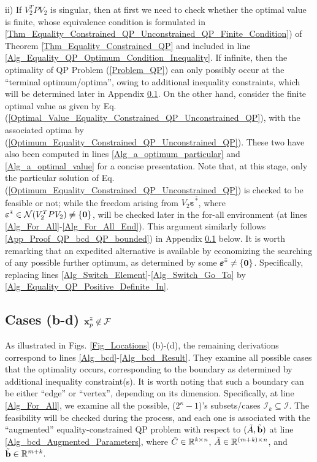 \documentclass{imaman}
\newcommand{\bfb}{{\bf b}}
\newcommand{\bfx}{{\bf x}}
\newcommand{\bfvarepsilon}{{\boldsymbol \varepsilon}}
\newcommand{\bfzero}{{\bf 0}}
\newcommand{\real}{\mathbb{R}}
\newcommand{\calF}{{\mathcal F}}
\newcommand{\calI}{{\mathcal I}}
\newcommand{\calN}{{\mathcal N}}
\newcommand{\itk}{{\it k}}
\newcommand{\itm}{{\it m}}
\newcommand{\itn}{{\it n}}
\numberwithin{equation}{section}
\begin{document}
\vspace{-0.1cm}\noindent ii) If $V_2^TPV_2$ is singular, then at first we need to check whether the optimal value is finite, whose equivalence condition is formulated in \ref{Thm_Equality_Constrained_QP_Unconstrained_QP_Finite_Condition}) of Theorem \ref{Thm_Equality_Constrained_QP} and included in line \ref{Alg_Equality_QP_Optimum_Condition_Inequality}. If infinite, then the optimality of QP Problem (\ref{Problem_QP}) can only possibly occur at the ``terminal optimum/optima'', owing to additional inequality constraints, which will be determined later in Appendix \ref{App_Proof_QP_bcd}. On the other hand, consider the finite optimal value as given by Eq. (\ref{Optimal_Value_Equality_Constrained_QP_Unconstrained_QP}), with the associated optima by (\ref{Optimum_Equality_Constrained_QP_Unconstrained_QP}). These two have also been computed in lines \ref{Alg_a_optimum_particular} and \ref{Alg_a_optimal_value} for a concise presentation. Note that, at this stage, only the particular solution of Eq. (\ref{Optimum_Equality_Constrained_QP_Unconstrained_QP}) is checked to be feasible or not; while the freedom arising from $V_2\bfvarepsilon^{\bar *}$, where $\bfvarepsilon^{\bar *}\in\calN(V_2^TPV_2)\ne\{\bfzero\}$, will be checked later in the for-all environment (at lines \ref{Alg_For_All}-\ref{Alg_For_All_End}). This argument similarly follows \ref{App_Proof_QP_bcd_QP_bounded}) in Appendix \ref{App_Proof_QP_bcd} below. It is worth remarking that an expedited alternative is available by economizing the searching of any possible further optimum, as determined by some $\bfvarepsilon^{\bar *}\ne\{\bfzero\}$. Specifically, replacing lines \ref{Alg_Switch_Element}-\ref{Alg_Switch_Go_To} by \ref{Alg_Equality_QP_Positive_Definite_In}.

\vspace{-0.3cm}\subsection{Cases (b-d) $\bfx_p^{\bar *}\not\in\calF$}
\label{App_Proof_QP_bcd}\vspace{-0.1cm}
As illustrated in Figs. \ref{Fig_Locations} (b)-(d), the remaining derivations correspond to lines \ref{Alg_bcd}-\ref{Alg_bcd_Result}. They examine all possible cases that the optimality occurs, corresponding to the boundary as determined by additional inequality constraint(s). It is worth noting that such a boundary can be either ``edge'' or ``vertex'', depending on its dimension. Specifically, at line \ref{Alg_For_All}, we examine all the possible, ($2^\kappa-1$)'s subsets/cases $\calI_k\subseteq\calI$. The feasibility will be checked during the process, and each one is associated with the ``augmented'' equality-constrained QP problem with respect to $(\tilde A,\tilde\bfb)$ at line \ref{Alg_bcd_Augmented_Parameters}, where $\tilde C\in\real^{\itk\times\itn}$, $\tilde A\in\real^{(\itm+\itk)\times\itn}$, and $\tilde\bfb\in\real^{\itm+\itk}$.
\end{document}
